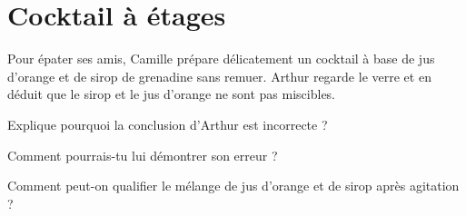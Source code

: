 \section{Cocktail à étages}

Pour épater ses amis, Camille prépare délicatement un cocktail à base de jus d'orange et de sirop de grenadine sans remuer. Arthur regarde le verre et en déduit que le sirop et le jus d'orange ne sont pas miscibles.

\begin{questions}
	\question Explique pourquoi la conclusion d'Arthur est incorrecte ?
	
	\question Comment pourrais-tu lui démontrer son erreur ?
	
	\question Comment peut-on qualifier le mélange de jus d'orange et de sirop après agitation ?
\end{questions}